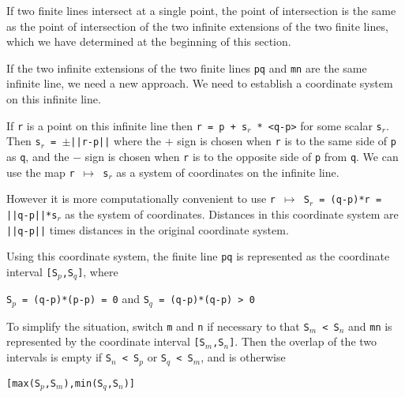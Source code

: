 \documentclass[12pt]{article}
\begin{document}
If two finite lines intersect at a single point, the point of intersection
is the same as the point of intersection of the two infinite extensions
of the two finite lines, which we have determined at the beginning
of this section.

If the two infinite extensions of the two finite lines {\tt pq} and
{\tt mn} are the same
infinite line, we need a new approach.  We need to establish a coordinate
system on this infinite line.

If {\tt r} is a point on this infinite line then
{\tt r = p + s$_r$ * <q-p>} for some scalar {\tt s$_r$}.  Then
{\tt s$_r$ = $\pm$||r-p||} where the $+$ sign is chosen when {\tt r}
is to the same side of {\tt p} as {\tt q}, and the $-$ sign is chosen
when {\tt r} is to the opposite side of {\tt p} from {\tt q}.
We can use the map {\tt r $\mapsto$ s$_r$} as a system of coordinates
on the infinite line.

However it is more computationally convenient to use
{\tt r $\mapsto$ S$_r$ = (q-p)*r = ||q-p||*s$_r$} as the system of coordinates.
Distances in this coordinate system are {\tt ||q-p||} times distances in the
original coordinate system.

Using this coordinate system, the finite line {\tt pq} is represented
as the coordinate interval {\tt [S$_p$,S$_q$]}, where \\
\centerline{{\tt S$_p$ = (q-p)*(p-p) = 0} and {\tt S$_q$ = (q-p)*(q-p) > 0 }}
To simplify
the situation, switch {\tt m} and {\tt n} if necessary to that
{\tt S$_m$ < S$_n$} and {\tt mn} is represented by the coordinate
interval {\tt [S$_m$,S$_n$]}.  Then the overlap of the two intervals
is empty if {\tt S$_n$ < S$_p$} or {\tt S$_q$ < S$_m$}, and is
otherwise \\
\centerline{\tt [max(S$_p$,S$_m$),min(S$_q$,S$_n$)]}
\end{document}
